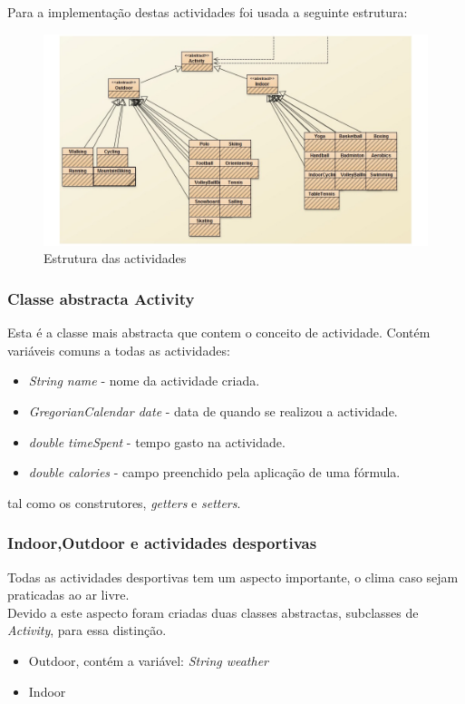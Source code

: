 \documentclass[10pt,notitlepage]{article}
\begin{document}
Para a implementação destas actividades foi usada a seguinte estrutura:



\begin{figure}[ht]
\centering
\includegraphics[scale=0.5]{Activity2.jpg}
\caption{Estrutura das actividades}
\label{fig:actividades}
\end{figure}


\subsubsection{Classe abstracta Activity}

Esta é a classe mais abstracta que contem o conceito de actividade. Contém variáveis comuns a todas as actividades:
\begin{itemize}
\item \textit{String name} - nome da actividade criada.
\item \textit{GregorianCalendar date} - data de quando se realizou a actividade.
\item \textit{double timeSpent} - tempo gasto na actividade.
\item \textit{double calories} - campo preenchido pela aplicação de uma fórmula.
\end{itemize}
tal como os construtores, \textit{getters} e \textit{setters}.


\subsubsection{Indoor,Outdoor e actividades desportivas}
Todas as actividades desportivas tem um aspecto importante, o clima caso sejam praticadas ao ar livre.\\
Devido a este aspecto foram criadas duas classes abstractas, subclasses de \textit{Activity}, para essa distinção.
\begin{itemize}
\item Outdoor, contém a variável: \textit{String weather}
\item Indoor
\end{itemize}
\end{document}
